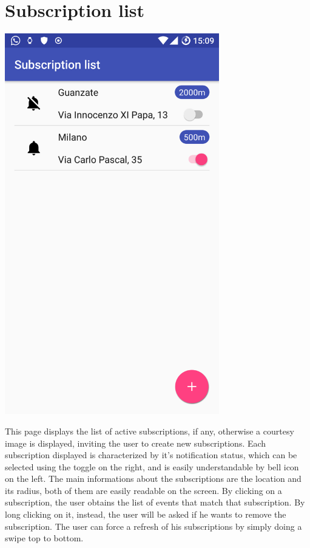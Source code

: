 \documentclass[a4paper]{scrreprt}
\begin{document}
\section{Subscription list}
\begin{minipage}{0.5\textwidth}
	\centering
	\includegraphics[width=0.7\textwidth]{imgs/subscription_list}
\end{minipage}
\begin{minipage}{0.5\textwidth}
	This page displays the list of active subscriptions, if any, otherwise a courtesy image is displayed, inviting the user to create new subscriptions. Each subscription displayed is characterized by it's notification status, which can be selected using the toggle on the right, and is easily understandable by bell icon on the left. The main informations about the subscriptions are the location and its radius, both of them are easily readable on the screen. By clicking on a subscription, the user obtains the list of events that match that subscription. By long clicking on it, instead, the user will be asked if he wants to remove the subscription. The user can force a refresh of his subscriptions by simply doing a swipe top to bottom.
\end{minipage}
\end{document}
